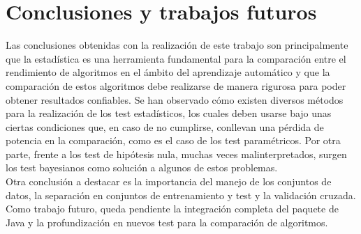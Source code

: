 %
%


\chapter*{Conclusiones y trabajos futuros}


	Las conclusiones obtenidas con la realización de este trabajo son principalmente que la estadística es una herramienta fundamental para la comparación entre el rendimiento de algoritmos en el ámbito del aprendizaje automático y que la comparación de estos algoritmos debe 
realizarse de manera rigurosa para poder obtener resultados confiables. Se han observado cómo existen diversos métodos para la realización de los test estadísticos, los cuales 
deben usarse bajo unas ciertas condiciones que, en caso 
de no cumplirse, conllevan una pérdida de potencia en la comparación, como es el caso de los test paramétricos. Por otra parte, frente a los test de hipótesis nula, muchas veces malinterpretados, surgen los test bayesianos como solución a algunos de estos problemas.\\
Otra conclusión a destacar es la importancia del manejo de
los conjuntos de datos, la separación en conjuntos de entrenamiento y test y la validación cruzada.\\
Como trabajo futuro, queda pendiente la integración completa del paquete de Java y la profundización en nuevos test para la comparación de algoritmos. 


%